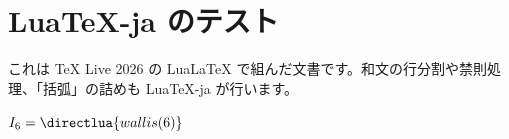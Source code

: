 \documentclass{ltjsarticle}
\begin{document}
\section{LuaTeX-ja のテスト}
これは TeX Live 2026 の LuaLaTeX で組んだ文書です。和文の行分割や禁則処理、「括弧」の詰めも LuaTeX-ja が行います。

$I_6 = \directlua{wallis(6)}$
\end{document}
